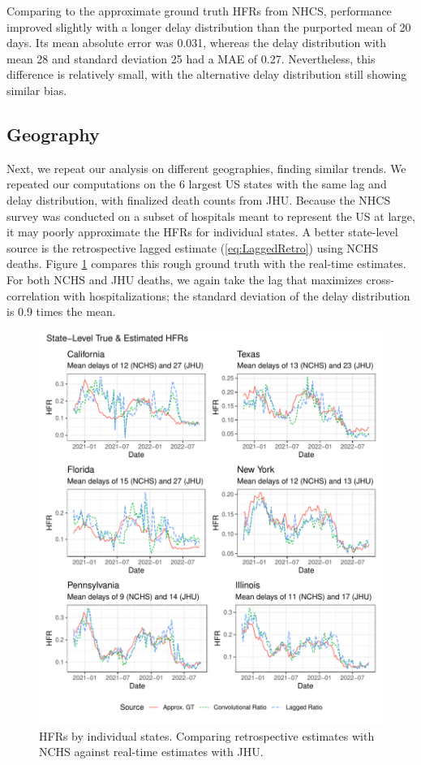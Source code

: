 \documentclass{article}
\begin{document}
Comparing to the approximate ground truth HFRs from NHCS, performance improved slightly with a longer delay distribution than the purported mean of 20 days. Its mean absolute error was 0.031, whereas the delay distribution with mean 28 and standard deviation 25 had a MAE of 0.27. Nevertheless, this difference is relatively small, with the alternative delay distribution still showing similar bias.

\subsection{Geography}

Next, we repeat our analysis on different geographies, finding similar trends. We repeated our computations on the 6 largest US states with the same lag and delay distribution, with finalized death counts from JHU. Because the NHCS survey was conducted on a subset of hospitals meant to represent the US at large, it may poorly approximate the HFRs for individual states. A better state-level source is the retrospective lagged estimate (\eqref{eq:LaggedRetro}) using NCHS deaths. Figure \ref{fig:state-level} compares this rough ground truth with the real-time estimates. For both NCHS and JHU deaths, we again take the lag that maximizes cross-correlation with hospitalizations; the standard deviation of the delay distribution is 0.9 times the mean. 

 \begin{figure}
     \centering
     \includegraphics[width=0.8\linewidth]{Figs/Real/state_level_hfrs.pdf}
     \caption{HFRs by individual states. Comparing retrospective estimates with NCHS against real-time estimates with JHU.}
     \label{fig:state-level}
 \end{figure}
\end{document}
